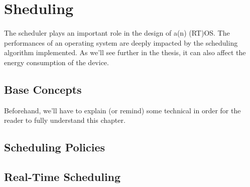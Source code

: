 \section{Sheduling}

\paragraph{}
The scheduler plays an important role in the design of a(n) (RT)OS.
The performances of an operating system are deeply impacted by the scheduling algorithm implemented.
As we'll see further in the thesis, it can also affect the energy consumption of the device.\\

\subsection{Base Concepts}
Beforehand, we'll have to explain (or remind) some technical in order for the reader to fully understand this chapter.




\subsection{Scheduling Policies}

\subsection{Real-Time Scheduling}
